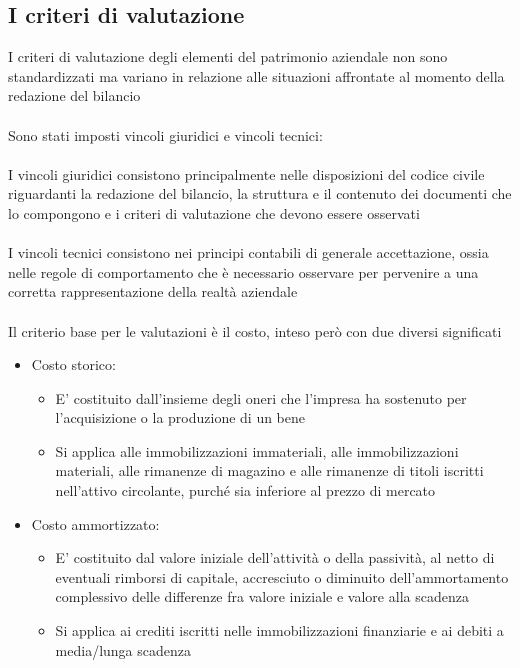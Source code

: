 \documentclass{report}
\begin{document}
\subsection{I criteri di valutazione} %
\label{sub:I criteri di valutazione}
I criteri di valutazione degli elementi del patrimonio aziendale non sono standardizzati ma variano in relazione alle situazioni affrontate al momento della redazione del bilancio 
\\
\\
Sono stati imposti vincoli giuridici e vincoli tecnici:
\\
\\
I vincoli giuridici consistono principalmente nelle disposizioni del codice civile riguardanti la redazione del bilancio, la struttura e il contenuto dei documenti che lo compongono e i criteri di valutazione che devono essere osservati
\\
\\
I vincoli tecnici consistono nei principi contabili di generale accettazione, ossia nelle regole di comportamento che è necessario osservare per pervenire a una corretta rappresentazione della realtà aziendale 
\\
\\
Il criterio base per le valutazioni è il costo, inteso però con due diversi significati
\begin{itemize}
  \item{Costo storico: \\
    \begin{itemize}
      \item{E' costituito dall'insieme degli oneri che l'impresa ha sostenuto per l'acquisizione o la produzione di un bene}
      \item{Si applica alle immobilizzazioni immateriali, alle immobilizzazioni materiali, alle rimanenze di magazino e alle rimanenze di titoli iscritti nell'attivo circolante, purché sia inferiore al prezzo di mercato}
    \end{itemize}
}
  \item{Costo ammortizzato: \\
    \begin{itemize}
      \item{E' costituito dal valore iniziale dell'attività o della passività, al netto di eventuali rimborsi di capitale, accresciuto o diminuito dell'ammortamento complessivo delle differenze fra valore iniziale e valore alla scadenza}
      \item{Si applica ai crediti iscritti nelle immobilizzazioni finanziarie e ai debiti a media/lunga scadenza}
    \end{itemize}
}
\end{itemize}
\end{document}

